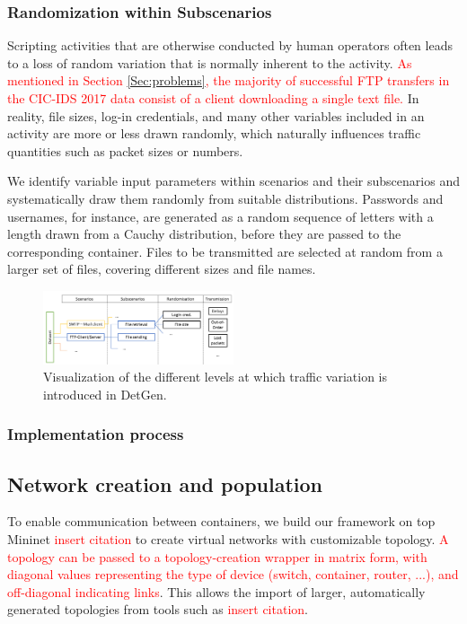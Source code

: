\documentclass[sigconf]{acmart}
\begin{document}
\subsubsection*{Randomization within Subscenarios}\label{Sec:randomsubscen}

Scripting activities that are otherwise conducted by human operators often leads to a loss of random variation that is normally inherent to the activity.
\textcolor{red}{As mentioned in Section \ref{Sec:problems}, the majority of successful FTP transfers in the CIC-IDS 2017 data consist of a client downloading a single text file.} In reality, file sizes, log-in credentials, and many other variables included in an activity are more or less drawn randomly, which naturally influences traffic quantities such as packet sizes or numbers.

We identify variable input parameters within scenarios and their subscenarios and systematically draw them randomly from suitable distributions. Passwords and usernames, for instance, are generated as a random sequence of letters with a length drawn from a Cauchy distribution, before they are passed to the corresponding container. Files to be transmitted are selected at random from a larger set of files, covering different sizes and file names.

\begin{figure}
 \centering 
 \includegraphics[width=0.5\textwidth]{images/scenario_branching.PNG}
 \caption{Visualization of the different levels at which traffic variation is introduced in DetGen.}
 \label{Fig:branching}
\end{figure}

\subsubsection*{Implementation process}

\subsection{Network creation and population}


To enable communication between containers, we build our framework on top Mininet \textcolor{red}{insert citation} to create virtual networks with customizable topology. 
\textcolor{red}{A topology can be passed to a topology-creation wrapper in matrix form, with diagonal values representing the type of device (switch, container, router, ...), and off-diagonal indicating links}. This allows the import of larger, automatically generated topologies from tools such as \textcolor{red}{insert citation}. 
\end{document}
